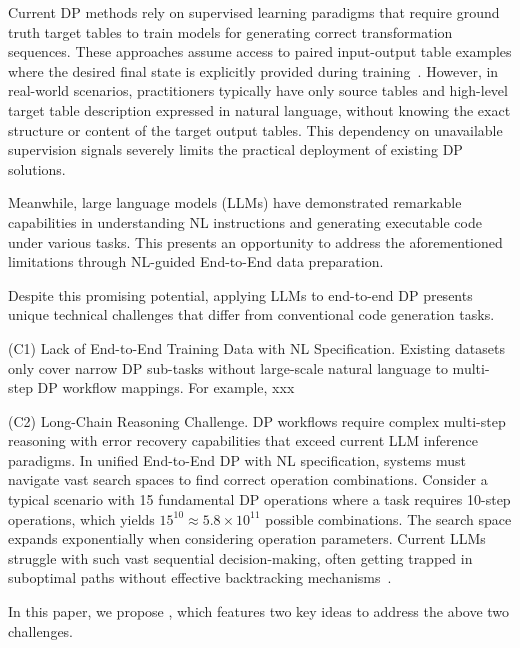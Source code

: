  Current DP methods rely on supervised learning paradigms that require ground truth target tables to train models for generating correct transformation sequences. These approaches assume access to paired input-output table examples where the desired final state is explicitly provided during training~\cite{DBLP:conf/sigmod/YanH20}. However, in real-world scenarios, practitioners typically have only source tables and high-level target table description expressed in natural language, without knowing the exact structure or content of the target output tables. This dependency on unavailable supervision signals severely limits the practical deployment of existing DP solutions.

 Meanwhile, large language models (LLMs) have demonstrated remarkable capabilities in understanding NL instructions and generating executable code under various tasks. This presents an opportunity to address the aforementioned limitations through NL-guided End-to-End data preparation. 

 Despite this promising potential, applying LLMs to end-to-end DP presents unique technical challenges that differ from conventional code generation tasks.

{(C1) Lack of End-to-End Training Data with NL Specification.} Existing datasets only cover narrow DP sub-tasks without large-scale natural language to multi-step DP workflow mappings. For example, xxx

{(C2) Long-Chain Reasoning Challenge.} DP workflows require complex multi-step reasoning with error recovery capabilities that exceed current LLM inference paradigms. In unified End-to-End DP with NL specification, systems must navigate vast search spaces to find correct operation combinations. Consider a typical scenario with 15 fundamental DP operations where a task requires 10-step operations, which yields $15^{10} \approx 5.8 \times 10^{11}$ possible combinations. The search space expands exponentially when considering operation parameters. Current LLMs struggle with such vast sequential decision-making, often getting trapped in suboptimal paths without effective backtracking mechanisms~\cite{xxx}.

 In this paper, we propose \sys, which features two key ideas to address the above two challenges. 

